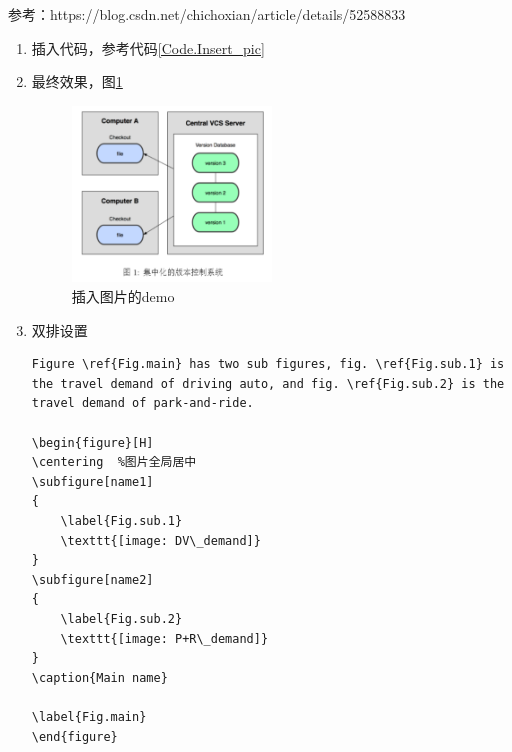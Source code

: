 \documentclass[UTF8]{ctexart}
\begin{document}
参考：https://blog.csdn.net/chichoxian/article/details/52588833

\begin{enumerate}
    \item 插入代码，参考代码\ref{Code.Insert_pic}
    \item 最终效果，图\ref{Fig.insert-one-png}
          \begin{figure}[H] %
              \centering %
              \includegraphics[width=0.5\textwidth]{images/insert-png.png} %
              \caption{插入图片的demo} %
              \label{Fig.insert-one-png} %
          \end{figure}

    \item 双排设置
          \begin{lstlisting}
Figure \ref{Fig.main} has two sub figures, fig. \ref{Fig.sub.1} is the travel demand of driving auto, and fig. \ref{Fig.sub.2} is the travel demand of park-and-ride.

\begin{figure}[H]
\centering  %图片全局居中
\subfigure[name1]
{
    \label{Fig.sub.1}
    \texttt{[image: DV\_demand]}
}
\subfigure[name2]
{
    \label{Fig.sub.2}
    \texttt{[image: P+R\_demand]}
}
\caption{Main name}

\label{Fig.main}
\end{figure}
        \end{lstlisting}


\end{enumerate}
\end{document}
